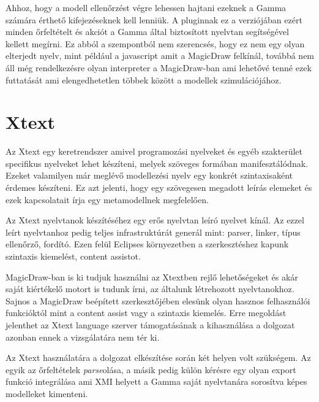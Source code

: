 Ahhoz, hogy a modell ellenőrzést végre lehessen hajtani ezeknek a Gamma számára érthető kifejezéseknek kell lenniük. A pluginnak ez a verziójában ezért minden őrfeltételt és akciót a Gamma által biztosított nyelvtan segítségével kellett megírni. Ez abból a szempontból nem szerencsés, hogy ez nem egy olyan elterjedt nyelv, mint például a javascript amit a MagicDraw felkínál, továbbá nem áll még rendelkezésre olyan interpreter a MagicDraw-ban ami lehetővé tenné ezek futtatását ami elengedhetetlen többek között a modellek szimulációjához.


\section{Xtext}

Az Xtext egy keretrendszer amivel programozási nyelveket és egyéb szakterület specifikus nyelveket lehet készíteni, melyek szöveges formában manifesztálódnak. Ezeket valamilyen már meglévő modellezési nyelv egy konkrét szintaxisaként érdemes készíteni. Ez azt jelenti, hogy egy szövegesen megadott leírás elemeket és ezek kapcsolatait írja egy metamodellnek megfelelően.

Az Xtext nyelvtanok készítéséhez egy erős nyelvtan leíró nyelvet kínál. Az ezzel leírt nyelvtanhoz pedig teljes infrastruktúrát generál mint: parser, linker, típus ellenőrző, fordító. Ezen felül Eclipses környezetben a szerkesztéshez kapunk szintaxis kiemelést, content assistot.

MagicDraw-ban is ki tudjuk használni az Xtextben rejlő lehetőségeket és akár saját kiértékelő motort is tudunk írni, az általunk létrehozott nyelvtanokhoz. Sajnos a MagicDraw beépített szerkesztőjében elesünk olyan hasznos felhasználói funkcióktól mint a content assist vagy a szintaxis kiemelés. Erre megoldást jelenthet az Xtext language szerver támogatásának a kihasználása a dolgozat azonban ennek a vizsgálatára nem tér ki.

Az Xtext használatára a dolgozat elkészítése során két helyen volt szükségem. Az egyik az őrfeltételek \emph{parse}olása, a másik pedig külön kérésre egy olyan export funkció integrálása ami XMI helyett a Gamma saját nyelvtanára sorosítva képes modelleket kimenteni.



